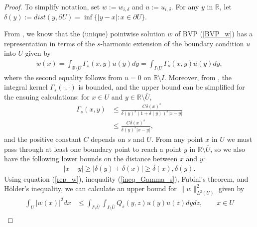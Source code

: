 \documentclass[preprint,12pt]{elsarticle}
\newcommand{\R}{\mathbb R}
\begin{document}
\begin{proof}
    To simplify notation, set $w:=w_{i,\delta}$ and $u:=u_{i,\delta}$. For any $y$ in $\R$, let $\delta(y):=dist(y, \partial U)=\inf\{|y-x|: x\in\partial U\}$. 
    
    From \cite[Th. 1.2.3]{Ab1}, we know that the (unique) pointwise solution $w$ of BVP (\ref{BVP_w}) has a representation in terms of the $s$-harmonic extension of the boundary condition $u$ into $U$ given by
    \begin{align}\label{rep_w}
        w(x)=\int_{\R\setminus\overline{U}}\Gamma_s(x,y)u(y)dy=\int_{I\setminus\overline{U}}\Gamma_s(x,y)u(y)dy,
    \end{align}
    where the second equality follows from $u=0$ on $\R\setminus I$. Moreover, from \cite[Rm. 1.2.5]{Ab1}, the integral kernel $\Gamma_s(\cdot,\cdot)$ is bounded, and the upper bound can be simplified for the ensuing calculations: for $x\in U$ and $y\in \R\setminus\overline{U}$,
    \begin{align}\label{ineq_Gamma_s}
        \Gamma_s(x,y)&\leq \frac{C\delta(x)^s}{\delta(y)^s(1+\delta(y))^s|x-y|}\nonumber\\
        &\leq \frac{C\delta(x)^s}{\delta(y)^s|x-y|},
    \end{align}
    and the positive constant $C$ depends on $s$ and $U$.
    From any point $x$ in $U$ we must pass through at least one boundary point to reach a point $y$ in $\R\setminus\overline{U}$, so we also have the following lower bounds on the distance between $x$ and $y$:
    \begin{align}\label{lower_bound_xy}
        |x-y|\geq |\delta(y)+\delta(x)|\geq \delta(x),\delta(y).
    \end{align}
    Using equation (\ref{rep_w}), inequality (\ref{ineq_Gamma_s}), Fubini's theorem, and H\"{o}lder's inequality, we can calculate an upper bound for $\|w\|_{L^2(U)}^2$ given by
    \begin{align}\label{L2_inquality_w}
        \int_{U}|w(x)|^2dx&\leq\int_{I\setminus\overline{U}}\int_{I\setminus\overline{U}}Q_s(y,z)u(y)u(z)dydz,\qquad x\in U\nonumber\\

\end{align}
\end{proof}
\end{document}
